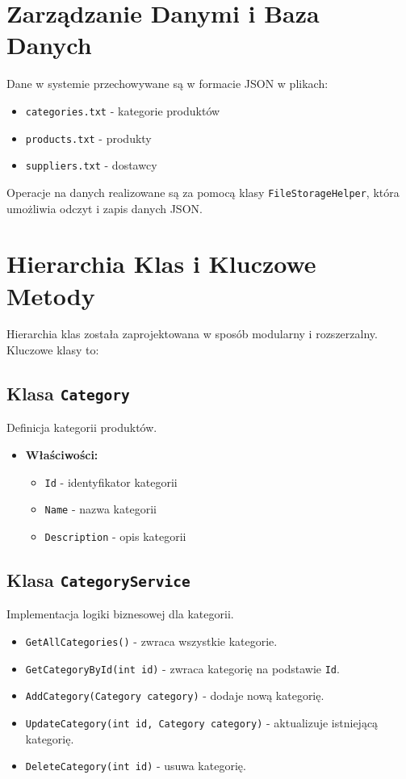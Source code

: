 \section{Zarządzanie Danymi i Baza Danych}
Dane w systemie przechowywane są w formacie JSON w plikach:
\begin{itemize}
    \item \texttt{categories.txt} - kategorie produktów
    \item \texttt{products.txt} - produkty
    \item \texttt{suppliers.txt} - dostawcy
\end{itemize}

Operacje na danych realizowane są za pomocą klasy \texttt{FileStorageHelper}, która umożliwia odczyt i zapis danych JSON.

\section{Hierarchia Klas i Kluczowe Metody}
Hierarchia klas została zaprojektowana w sposób modularny i rozszerzalny. Kluczowe klasy to:

\subsection{Klasa \texttt{Category}}
Definicja kategorii produktów.
\begin{itemize}
    \item \textbf{Właściwości:}
    \begin{itemize}
        \item \texttt{Id} - identyfikator kategorii
        \item \texttt{Name} - nazwa kategorii
        \item \texttt{Description} - opis kategorii
    \end{itemize}
\end{itemize}

\subsection{Klasa \texttt{CategoryService}}
Implementacja logiki biznesowej dla kategorii.
\begin{itemize}
    \item \texttt{GetAllCategories()} - zwraca wszystkie kategorie.
    \item \texttt{GetCategoryById(int id)} - zwraca kategorię na podstawie \texttt{Id}.
    \item \texttt{AddCategory(Category category)} - dodaje nową kategorię.
    \item \texttt{UpdateCategory(int id, Category category)} - aktualizuje istniejącą kategorię.
    \item \texttt{DeleteCategory(int id)} - usuwa kategorię.
\end{itemize}

